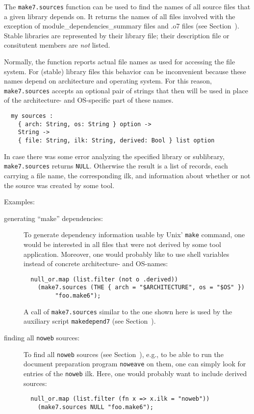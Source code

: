 The {\tt make7.sources} function can be used to find the names of all
source files that a given library depends on.  It returns the names of
all files involved with the exception of module_dependencies_summary files and .o7 files
(see Section~).  Stable libraries are represented by
their library file; their description file or consitutent members are
{\em not} listed.

Normally, the function reports actual file names as used for accessing
the file system.  For (stable) library files this behavior can be
inconvenient because these names depend on architecture and operating
system.  For this reason, {\tt make7.sources} accepts an optional pair of
strings that then will be used in place of the architecture- and
OS-specific part of these names.

\begin{verbatim}
  my sources :
    { arch: String, os: String } option ->
    String ->
    { file: String, ilk: String, derived: Bool } list option
\end{verbatim}

In case there was some error analyzing the specified library or sublibrary,
{\tt make7.sources} returns {\tt NULL}.  Otherwise the result is a list
of records, each carrying a file name, the corresponding ilk, and
information about whether or not the source was created by some tool.

Examples:

\begin{description}
\item[generating ``make'' dependencies:]
To generate dependency information usable by Unix' {\tt make} command,
one would be interested in all files that were not derived by some
tool application.  Moreover, one would probably like to use shell
variables instead of concrete architecture- and OS-names:
\begin{verbatim}
  null_or.map (list.filter (not o .derived))
    (make7.sources (THE { arch = "$ARCHITECTURE", os = "$OS" })
         "foo.make6");
\end{verbatim}
A call of {\tt make7.sources} similar to the one shown here is used by
the auxiliary script {\tt makedepend7} (see
Section~).
\item[finding all {\tt noweb} sources:]
To find all {\tt noweb} sources (see Section~),
e.g., to be able to run the document preparation program {\tt noweave}
on them, one can simply look for entries of the {\tt noweb} ilk.
Here, one would probably want to include derived sources:
\begin{verbatim}
  null_or.map (list.filter (fn x => x.ilk = "noweb"))
    (make7.sources NULL "foo.make6");
\end{verbatim}
\end{description}

